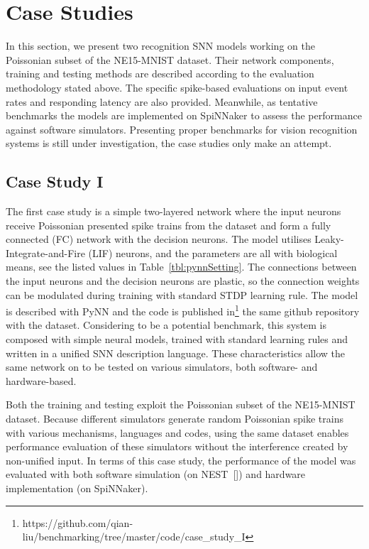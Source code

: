 \section{Case Studies}
\label{sec:test}
In this section, we present two recognition SNN models working on the Poissonian subset of the NE15-MNIST dataset.
Their network components, training and testing methods are described according to the evaluation methodology stated above.
The specific spike-based evaluations on input event rates and responding latency are also provided. 
Meanwhile, as tentative benchmarks the models are implemented on SpiNNaker to assess the performance against software simulators.
Presenting proper benchmarks for vision recognition systems is still under investigation, the case studies only make an attempt.

\subsection{Case Study I}
The first case study is a simple two-layered network where the input neurons receive Poissonian presented spike trains from the dataset and form a fully connected (FC) network with the decision neurons.
The model utilises Leaky-Integrate-and-Fire (LIF) neurons, and the parameters are all with biological means, see the listed values in Table~\ref{tbl:pynnSetting}.
The connections between the input neurons and the decision neurons are plastic, so the connection weights can be modulated during training with standard STDP learning rule.
The model is described with PyNN and the code is published in\footnote {https://github.com/qian-liu/benchmarking/tree/master/code/case\_study\_I} the same github repository with the dataset.
Considering to be a potential benchmark, this system is composed with simple neural models, trained with standard learning rules and written in a unified SNN description language. These characteristics allow the same network on to be tested on various simulators, both software- and hardware-based.

Both the training and testing exploit the Poissonian subset of the NE15-MNIST dataset.
Because different simulators generate random Poissonian spike trains with various mechanisms, languages and codes, using the same dataset enables   performance evaluation of these simulators without the interference created by non-unified input.
In terms of this case study, the performance of the model was evaluated with both software simulation (on NEST~[\cite{gewaltig2007nest}]) and hardware implementation (on SpiNNaker).

